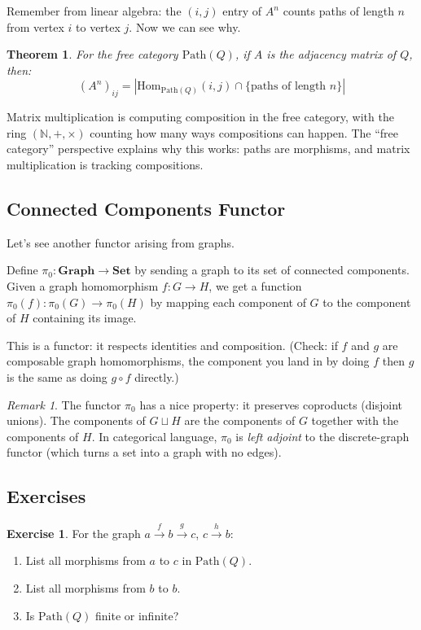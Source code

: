 \documentclass[11pt]{article}
\newcommand{\N}{\mathbb{N}}
\newcommand{\cat}[1]{\mathbf{#1}}
\newcommand{\Set}{\cat{Set}}
\newcommand{\Hom}{\mathrm{Hom}}
\theoremstyle{definition}
\newtheorem{exercise}{Exercise}[section]
\theoremstyle{plain}
\newtheorem{theorem}{Theorem}[section]
\theoremstyle{remark}
\newtheorem*{remark}{Remark}
\begin{document}
Remember from linear algebra: the $(i,j)$ entry of $A^n$ counts paths of length $n$ from vertex $i$ to vertex $j$. Now we can see why.

\begin{theorem}
For the free category $\text{Path}(Q)$, if $A$ is the adjacency matrix of $Q$, then:
\[
(A^n)_{ij} = |\Hom_{\text{Path}(Q)}(i, j) \cap \{\text{paths of length } n\}|
\]
\end{theorem}

Matrix multiplication is computing composition in the free category, with the ring $(\N, +, \times)$ counting how many ways compositions can happen. The ``free category'' perspective explains why this works: paths are morphisms, and matrix multiplication is tracking compositions.

\subsection{Connected Components Functor}

Let's see another functor arising from graphs.

Define $\pi_0: \cat{Graph} \to \Set$ by sending a graph to its set of connected components. Given a graph homomorphism $f: G \to H$, we get a function $\pi_0(f): \pi_0(G) \to \pi_0(H)$ by mapping each component of $G$ to the component of $H$ containing its image.

This is a functor: it respects identities and composition. (Check: if $f$ and $g$ are composable graph homomorphisms, the component you land in by doing $f$ then $g$ is the same as doing $g \circ f$ directly.)

\begin{remark}
The functor $\pi_0$ has a nice property: it preserves coproducts (disjoint unions). The components of $G \sqcup H$ are the components of $G$ together with the components of $H$. In categorical language, $\pi_0$ is \emph{left adjoint} to the discrete-graph functor (which turns a set into a graph with no edges).
\end{remark}

\subsection{Exercises}

\begin{exercise}
For the graph $a \xrightarrow{f} b \xrightarrow{g} c$, $c \xrightarrow{h} b$:
\begin{enumerate}[label=(\alph*)]
  \item List all morphisms from $a$ to $c$ in $\text{Path}(Q)$.
  \item List all morphisms from $b$ to $b$.
  \item Is $\text{Path}(Q)$ finite or infinite?
\end{enumerate}
\end{exercise}
\end{document}
